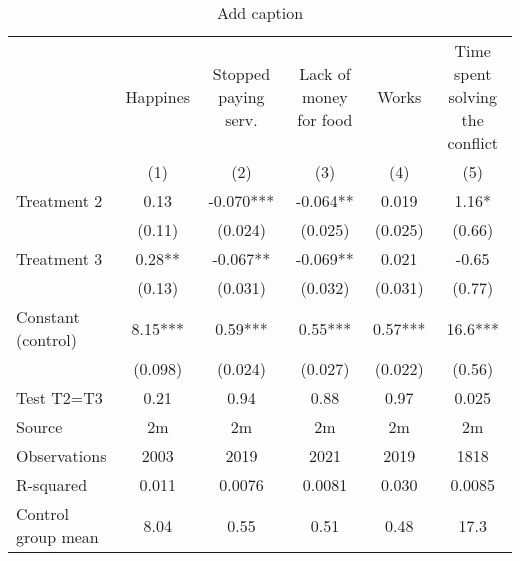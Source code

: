 \begin{table}[htbp]
  \centering
  \caption{Add caption}
    \begin{tabular}{lccccc}
    \toprule
    \toprule
          & \multicolumn{1}{p{5.39em}}{Happines } & \multicolumn{1}{p{5.39em}}{Stopped paying serv. } & \multicolumn{1}{p{5.335em}}{Lack of money for food } & \multicolumn{1}{p{5.39em}}{Works} & \multicolumn{1}{p{5.39em}}{Time spent solving the conflict } \\
          & (1)   & (2)   & (3)   & (4)   & (5) \\
    \midrule
    Treatment 2 & 0.13  & -0.070*** & -0.064** & 0.019 & 1.16* \\
          & (0.11) & (0.024) & (0.025) & (0.025) & (0.66) \\
    Treatment 3 & 0.28** & -0.067** & -0.069** & 0.021 & -0.65 \\
          & (0.13) & (0.031) & (0.032) & (0.031) & (0.77) \\
    Constant (control) & 8.15*** & 0.59*** & 0.55*** & 0.57*** & 16.6*** \\
          & (0.098) & (0.024) & (0.027) & (0.022) & (0.56) \\
    \midrule
    Test T2=T3  & 0.21  & 0.94  & 0.88  & 0.97  & 0.025 \\
    Source & 2m    & 2m    & 2m    & 2m    & 2m \\
    Observations  & 2003  & 2019  & 2021  & 2019  & 1818 \\
    R-squared & 0.011 & 0.0076 & 0.0081 & 0.030 & 0.0085 \\
    Control group mean  & 8.04  & 0.55  & 0.51  & 0.48  & 17.3 \\
    \bottomrule
    \bottomrule
    \end{tabular}%
  \label{tab:addlabel}%
\end{table}%
